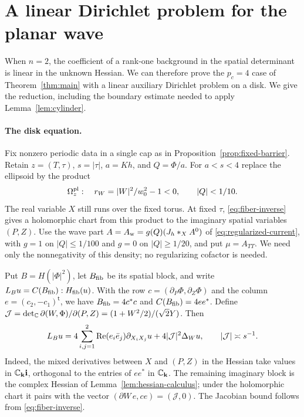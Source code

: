 \section{A linear Dirichlet problem for the planar wave}\label{sec:planar}

When $n=2$, the coefficient of a rank-one background in the spatial
determinant is linear in the unknown Hessian. We can therefore prove the
$p_c=4$ case of Theorem~\ref{thm:main} with a linear auxiliary Dirichlet
problem on a disk. We give the reduction, including the boundary estimate
needed to apply Lemma~\ref{lem:cylinder}.

\paragraph{The disk equation.}
Fix nonzero periodic data in a single cap as in
Proposition~\ref{prop:fixed-barrier}. Retain $z=(T,\tau)$, $s=|\tau|$,
$a=Kh$, and $Q=\Phi/a$. For $a<s<4$ replace the ellipsoid by the product
\[
 \Omega_z^{\rm pl}:\quad r_W=|W|^2/w_0^2-1<0,\qquad |Q|<1/10 .
\]
The real variable $X$ still runs over the fixed torus. At fixed $\tau$,
\eqref{eq:fiber-inverse} gives a holomorphic chart from this product to
the imaginary spatial variables $(P,Z)$.
Use the wave part $A=A_{\rm w}=g(Q)(J_h*_X A^0)$ of
\eqref{eq:regularized-current}, with $g=1$ on $|Q|\le1/100$ and $g=0$
on $|Q|\ge1/20$, and put $\mu=A_{TT}$. We need only the
nonnegativity of this density; no regularizing cofactor is needed.

Put $B=H(|\Phi|^2)$, let $B_{\rm fib}$ be its spatial block, and write
$L_Bu=C(B_{\rm fib}):H_{\rm fib}(u)$. With the row
$c=(\partial_P\Phi,\partial_Z\Phi)$ and the column
$e=(c_2,-c_1)^{\mathsf t}$, we have $B_{\rm fib}=4c^*c$ and
$C(B_{\rm fib})=4ee^*$. Define
$\mathcal J=\det_{\mathbb C}\partial(W,\Phi)/\partial(P,Z)=(1+W^2/2)/(\sqrt2Y)$. Then
\begin{equation}\label{eq:planar-disk-operator}
 L_Bu=4\sum_{i,j=1}^2\operatorname{Re}(e_i\bar e_j)\partial_{X_iX_j}u
       +4|\mathcal J|^2\Delta_Wu,\qquad |\mathcal J|\asymp s^{-1} .
\end{equation}
Indeed, the mixed derivatives between $X$ and $(P,Z)$ in the Hessian
take values in $\mathbb C_{\mathbf k}\mathbf i$, orthogonal to the entries of
$ee^*$ in $\mathbb C_{\mathbf k}$. The remaining imaginary block is the
complex Hessian of Lemma~\ref{lem:hessian-calculus}; under the
holomorphic chart it pairs with the vector $(\partial W\,e,c e)=(\mathcal J,0)$.
The Jacobian bound follows from \eqref{eq:fiber-inverse}.

